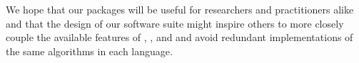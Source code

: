\documentclass[article]{jss}
\begin{document}

We hope that our packages will be useful for researchers and
practitioners alike and that the design of our software suite
might inspire others to more closely couple the available features
of , , and  and avoid
redundant implementations of the same algorithms in each language.



\newpage
\end{document}
